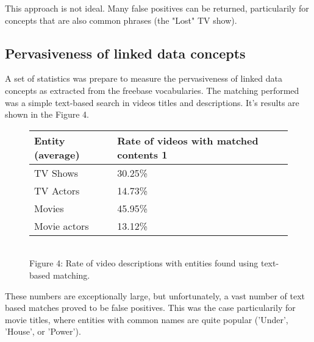 This approach is not ideal. Many false positives can be returned, particularily
for concepts that are also common phrases (\eg the "Lost" TV show).

\subsection{Pervasiveness of linked data concepts}
A set of statistics was prepare to measure the pervasiveness of linked data
concepts as extracted from the freebase vocabularies. The matching performed
was a simple text-based search in videos titles and descriptions. It's results
are shown in the Figure 4.

\begin{figure}[h!]
  \begin{center}
    \begin{tabular}{ | p{4cm} | p{6cm} | } \hline
      Entity (average) & Rate of videos with matched contents 1 \\ \hline
      TV Shows & 30.25\% \\ \hline
      TV Actors & 14.73\% \\ \hline
      Movies & 45.95\% \\ \hline
      Movie actors & 13.12\% \\ \hline
    \end{tabular} \\
    Figure 4: Rate of video descriptions with entities found using text-based matching. \\
  \end{center}
\end{figure}

These numbers are exceptionally large, but unfortunately, a vast number of text
based matches proved to be false positives. This was the case particularily for
movie titles, where entities with common names are quite popular (\eg 'Under',
'House', or 'Power').
